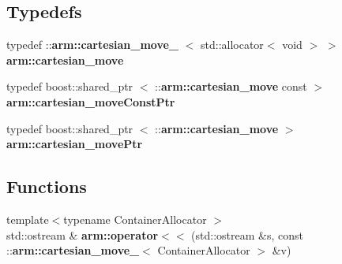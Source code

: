 \subsection*{\-Typedefs}
\begin{DoxyCompactItemize}
\item 
typedef \-::{\bf arm\-::cartesian\-\_\-move\-\_\-}\*
$<$ std\-::allocator$<$ void $>$ $>$ {\bf arm\-::cartesian\-\_\-move}
\item 
typedef boost\-::shared\-\_\-ptr\*
$<$ \-::{\bf arm\-::cartesian\-\_\-move} const  $>$ {\bf arm\-::cartesian\-\_\-move\-Const\-Ptr}
\item 
typedef boost\-::shared\-\_\-ptr\*
$<$ \-::{\bf arm\-::cartesian\-\_\-move} $>$ {\bf arm\-::cartesian\-\_\-move\-Ptr}
\end{DoxyCompactItemize}
\subsection*{\-Functions}
\begin{DoxyCompactItemize}
\item 
{\footnotesize template$<$typename Container\-Allocator $>$ }\\std\-::ostream \& {\bf arm\-::operator$<$$<$} (std\-::ostream \&s, const \-::{\bf arm\-::cartesian\-\_\-move\-\_\-}$<$ \-Container\-Allocator $>$ \&v)
\end{DoxyCompactItemize}
